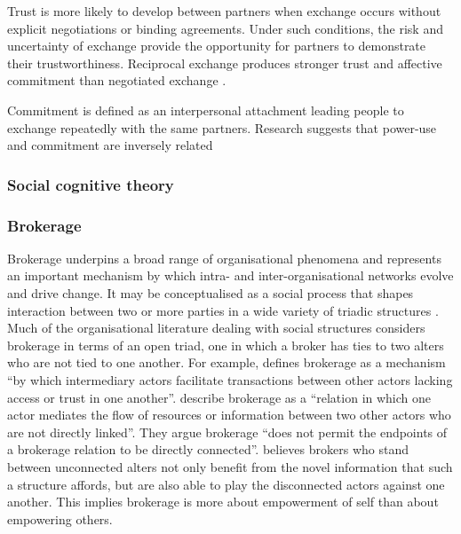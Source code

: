 Trust is more likely to develop between partners when exchange occurs without explicit negotiations or binding agreements. Under such conditions, the risk and uncertainty of exchange provide the opportunity for partners to demonstrate their trustworthiness. Reciprocal exchange produces stronger trust and affective commitment than negotiated exchange \citep{molm2000risk}. 

Commitment is defined as an interpersonal attachment leading people to exchange repeatedly with the same partners. Research suggests that power-use and commitment are inversely related \citep{cook1978power}


\subsubsection{Social cognitive theory}

\subsubsection{Brokerage}

Brokerage underpins a broad range of organisational phenomena and represents an important mechanism by which intra- and inter-organisational networks evolve and drive change. It may be conceptualised as a social process that shapes interaction between two or more parties in a wide variety of triadic structures \citep{obstfeld2002knowledge}. Much of the organisational literature dealing with social structures considers brokerage in terms of an open triad, one in which a broker has ties to two alters who are not tied to one another. For example, \citet{marsden1982brokerage} defines brokerage as a mechanism \enquote{by which intermediary actors facilitate transactions between other actors lacking access or trust in one another}. \citet{fernandez1994dilemma} describe brokerage as a \enquote{relation in which one actor mediates the flow of resources or information between two other actors who are not directly linked}. They argue brokerage \enquote{does not permit the endpoints of a brokerage relation to be directly connected}. \citet{burt1992structural} believes brokers who stand between unconnected alters not only benefit from the novel information that such a structure affords, but are also able to play the disconnected actors against one another. This implies brokerage is more about empowerment of self than about empowering others. \medskip

